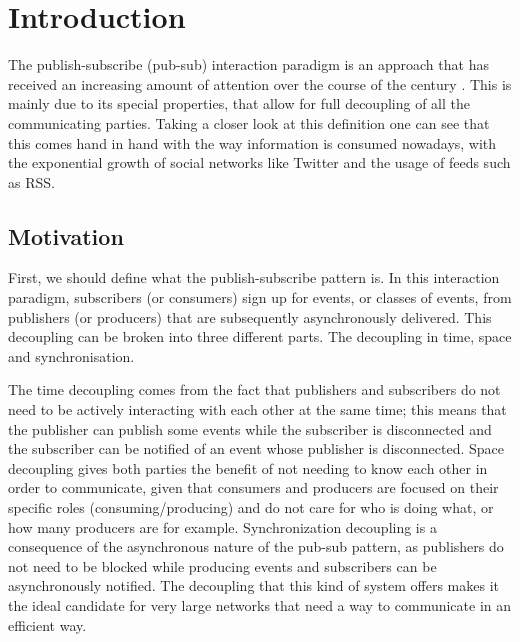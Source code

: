 
\chapter{Introduction}
\label{chapter:introduction}

The publish-subscribe (pub-sub) interaction paradigm is an approach that has
received an increasing amount of attention over the course of the century
\cite{Kermarrec2013} \cite{Eugster2003}.  This is mainly due to its special
properties, that allow for full decoupling of all the communicating parties.
Taking a closer look at this definition one can see that this comes hand in
hand with the way information is consumed nowadays, with the exponential growth
of social networks like Twitter and the usage of feeds such as RSS.


\section{Motivation}
First, we should define what the publish-subscribe pattern is.  In this
interaction paradigm, subscribers (or consumers) sign up for events, or classes
of events, from publishers (or producers) that are subsequently asynchronously
delivered. This decoupling can be broken into three different parts. The
decoupling in time, space and synchronisation.

The time decoupling comes from the fact that publishers and subscribers do not
need to be actively interacting with each other at the same time; this means
that the publisher can publish some events while the subscriber is disconnected
and the subscriber can be notified of an event whose publisher is disconnected.
Space decoupling gives both parties the benefit of not needing to know each
other in order to communicate, given that consumers and producers are focused
on their specific roles (consuming/producing) and do not care for who is doing
what, or how many producers are for example. Synchronization decoupling is a
consequence of the asynchronous nature of the pub-sub pattern, as publishers do
not need to be blocked while producing events and subscribers can be
asynchronously notified.  The decoupling that this kind of system offers makes
it the ideal candidate for very large networks that need a way to communicate
in an efficient way.

